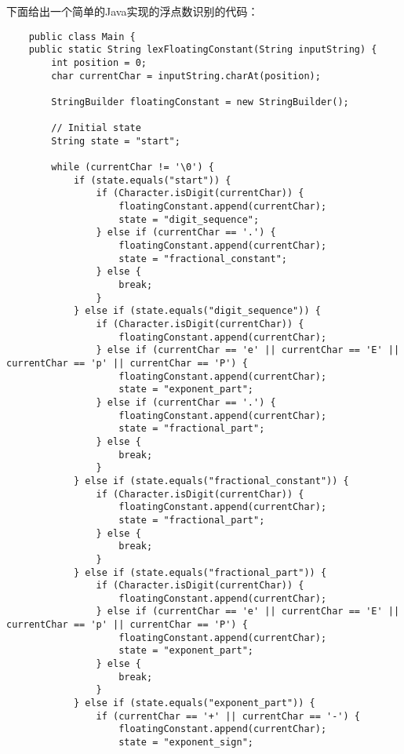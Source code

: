 \documentclass[a4paper, justified]{tufte-handout}
\begin{document}
\begin{solution}
  下面给出一个简单的Java实现的浮点数识别的代码：
  \begin{lstlisting}
    public class Main {
    public static String lexFloatingConstant(String inputString) {
        int position = 0;
        char currentChar = inputString.charAt(position);

        StringBuilder floatingConstant = new StringBuilder();

        // Initial state
        String state = "start";

        while (currentChar != '\0') {
            if (state.equals("start")) {
                if (Character.isDigit(currentChar)) {
                    floatingConstant.append(currentChar);
                    state = "digit_sequence";
                } else if (currentChar == '.') {
                    floatingConstant.append(currentChar);
                    state = "fractional_constant";
                } else {
                    break;
                }
            } else if (state.equals("digit_sequence")) {
                if (Character.isDigit(currentChar)) {
                    floatingConstant.append(currentChar);
                } else if (currentChar == 'e' || currentChar == 'E' || currentChar == 'p' || currentChar == 'P') {
                    floatingConstant.append(currentChar);
                    state = "exponent_part";
                } else if (currentChar == '.') {
                    floatingConstant.append(currentChar);
                    state = "fractional_part";
                } else {
                    break;
                }
            } else if (state.equals("fractional_constant")) {
                if (Character.isDigit(currentChar)) {
                    floatingConstant.append(currentChar);
                    state = "fractional_part";
                } else {
                    break;
                }
            } else if (state.equals("fractional_part")) {
                if (Character.isDigit(currentChar)) {
                    floatingConstant.append(currentChar);
                } else if (currentChar == 'e' || currentChar == 'E' || currentChar == 'p' || currentChar == 'P') {
                    floatingConstant.append(currentChar);
                    state = "exponent_part";
                } else {
                    break;
                }
            } else if (state.equals("exponent_part")) {
                if (currentChar == '+' || currentChar == '-') {
                    floatingConstant.append(currentChar);
                    state = "exponent_sign";

\end{lstlisting}
\end{solution}
\end{document}
